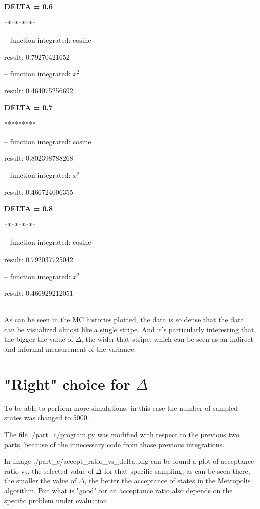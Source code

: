 \documentclass[paper=a4, fontsize=11pt]{scrartcl} %
\numberwithin{equation}{section} %
\numberwithin{figure}{section} %
\numberwithin{table}{section} %
\begin{document}
\textbf{DELTA = 0.6}

*********

 -- function integrated: cosine

	result: 0.79270421652

 -- function integrated: $x^2$

	result: 0.464075256692

\textbf{DELTA = 0.7}

*********

 -- function integrated: cosine

	result: 0.802398788268

 -- function integrated: $x^2$

	result: 0.466724006355

\textbf{DELTA = 0.8}

*********

 -- function integrated: cosine

	result: 0.792037725042

 -- function integrated: $x^2$

	result: 0.466929212051

\ \\

As can be seen in the MC histories plotted, the data is so dense that the data can be visualized almost like a single stripe. And it's particularly interesting that, the bigger the value of $\Delta$, the wider that stripe, which can be seen as an indirect and informal measurement of the variance.



\section{"Right" choice for $\Delta$}

To be able to perform more simulations, in this case the number of sampled states was changed to 5000.

The file ./part\_c/program.py was modified with respect to the previous two parts, because of the innecessary code from those previous integrations.

In image ./part\_c/accept\_ratio\_vs\_delta.png can be found a plot of acceptance ratio vs. the selected value of $\Delta$ for that specific sampling; as can be seen there, the smaller the value of $\Delta$, the better the acceptance of states in the Metropolis algorithm. But what is "good" for an acceptance ratio also depends on the specific problem under evaluation.
\end{document}
